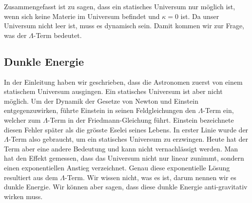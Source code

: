 \begin{refsection}
Zusammengefasst ist zu sagen, dass ein statisches Universum nur möglich ist, wenn sich keine Materie im Universum befindet und $\kappa = 0$ ist. Da unser Universum nicht leer ist, muss es dynamisch sein. Damit kommen wir zur Frage, was der $\Lambda$-Term bedeutet.

\subsection{Dunkle Energie}
In der Einleitung haben wir geschrieben, dass die Astronomen zuerst von einem statischem Universum ausgingen. Ein statisches Universum ist aber nicht möglich. Um der Dynamik der Gesetze von Newton und Einstein entgegenzuwirken, führte Einstein in seinen Feldgleichungen den $\Lambda$-Term ein, welcher zum $\Lambda$-Term in der Friedmann-Gleichung führt. Einstein bezeichnete diesen Fehler später als die grösste Eselei seines Lebens. In erster Linie wurde der $\Lambda$-Term also gebraucht, um ein statisches Universum zu erzwingen. Heute hat der Term aber eine andere Bedeutung und kann nicht vernachlässigt werden. Man hat den Effekt gemessen, dass das Universum nicht nur linear zunimmt, sondern einen exponentiellen Anstieg verzeichnet. Genau diese exponentielle Lösung resultiert aus dem $\Lambda$-Term. Wir wissen nicht, was es ist, darum nennen wir es dunkle Energie. Wir können aber sagen, dass diese dunkle Energie anti-gravitativ wirken muss.
\end{refsection}
